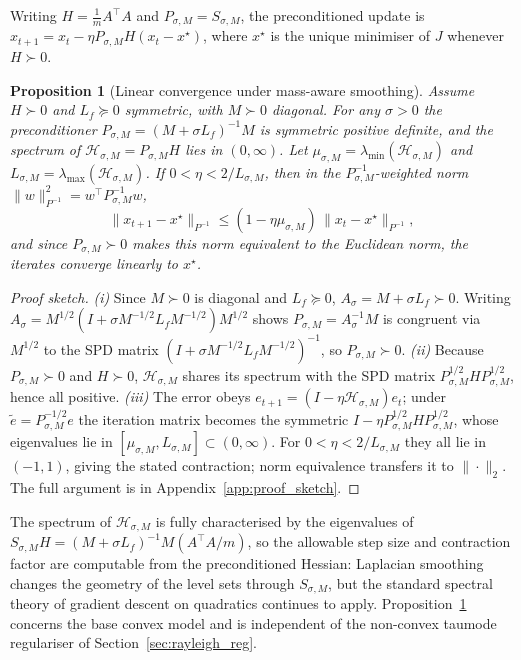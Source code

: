\documentclass[12pt,a4paper]{article}
\theoremstyle{plain}
\newtheorem{proposition}[theorem]{Proposition}
\theoremstyle{definition}
\theoremstyle{remark}
\newcommand{\1}{\mathbf{1}}
\begin{document}
Writing $H = \frac{1}{m} A^\top A$ and $P_{\sigma,M} = S_{\sigma,M}$, the
preconditioned update is
$x_{t+1} = x_t - \eta P_{\sigma,M} H (x_t - x^\star)$, where $x^\star$ is
the unique minimiser of $J$ whenever $H \succ 0$.

\begin{proposition}[Linear convergence under mass-aware smoothing]
\label{prop:convergence}
Assume $H \succ 0$ and $L_f \succeq 0$ symmetric, with $M \succ 0$
diagonal. For any $\sigma > 0$ the preconditioner
$P_{\sigma,M} = (M + \sigma L_f)^{-1} M$ is symmetric positive definite,
and the spectrum of $\mathcal{H}_{\sigma,M} = P_{\sigma,M} H$ lies in
$(0,\infty)$. Let
$\mu_{\sigma,M} = \lambda_{\min}(\mathcal{H}_{\sigma,M})$ and
$L_{\sigma,M} = \lambda_{\max}(\mathcal{H}_{\sigma,M})$. If
$0 < \eta < 2/L_{\sigma,M}$, then in the $P_{\sigma,M}^{-1}$-weighted
norm $\|w\|_{P^{-1}}^2 = w^\top P_{\sigma,M}^{-1} w$,
\[
    \|x_{t+1} - x^\star\|_{P^{-1}}
    \le (1 - \eta \mu_{\sigma,M})\,\|x_t - x^\star\|_{P^{-1}},
\]
and since $P_{\sigma,M} \succ 0$ makes this norm equivalent to the
Euclidean norm, the iterates converge linearly to $x^\star$.
\end{proposition}

\begin{proof}[Proof sketch]
\emph{(i)} Since $M \succ 0$ is diagonal and $L_f \succeq 0$,
$A_\sigma = M + \sigma L_f \succ 0$. Writing
$A_\sigma = M^{1/2}(I + \sigma M^{-1/2} L_f M^{-1/2})M^{1/2}$ shows
$P_{\sigma,M} = A_\sigma^{-1} M$ is congruent via $M^{1/2}$ to the SPD
matrix $(I + \sigma M^{-1/2} L_f M^{-1/2})^{-1}$, so
$P_{\sigma,M} \succ 0$.
\emph{(ii)} Because $P_{\sigma,M} \succ 0$ and $H \succ 0$,
$\mathcal{H}_{\sigma,M}$ shares its spectrum with the SPD matrix
$P_{\sigma,M}^{1/2} H P_{\sigma,M}^{1/2}$, hence all positive.
\emph{(iii)} The error obeys
$e_{t+1} = (I - \eta\mathcal{H}_{\sigma,M})e_t$; under
$\tilde e = P_{\sigma,M}^{-1/2} e$ the iteration matrix becomes the
symmetric $I - \eta P_{\sigma,M}^{1/2} H P_{\sigma,M}^{1/2}$, whose
eigenvalues lie in $[\mu_{\sigma,M},L_{\sigma,M}]\subset(0,\infty)$. For
$0<\eta<2/L_{\sigma,M}$ they all lie in $(-1,1)$, giving the stated
contraction; norm equivalence transfers it to $\|\cdot\|_2$. The full
argument is in Appendix~\ref{app:proof_sketch}.
\end{proof}

The spectrum of $\mathcal{H}_{\sigma,M}$ is fully characterised by the
eigenvalues of $S_{\sigma,M} H = (M + \sigma L_f)^{-1} M (A^\top A/m)$,
so the allowable step size and contraction factor are computable from
the preconditioned Hessian: Laplacian smoothing changes the geometry of
the level sets through $S_{\sigma,M}$, but the standard spectral theory
of gradient descent on quadratics continues to apply.
Proposition~\ref{prop:convergence} concerns the base convex model and is
independent of the non-convex taumode regulariser of
Section~\ref{sec:rayleigh_reg}.
\end{document}
